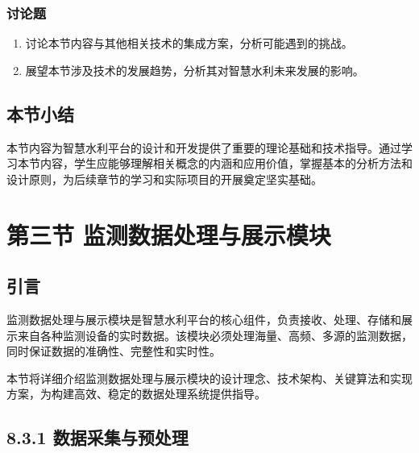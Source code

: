 \hypertarget{ux8ba8ux8bbaux9898}{%
\subsubsection{讨论题}\label{ux8ba8ux8bbaux9898}}

\begin{enumerate}
\def\labelenumi{\arabic{enumi}.}
\tightlist
\item
  讨论本节内容与其他相关技术的集成方案，分析可能遇到的挑战。
\item
  展望本节涉及技术的发展趋势，分析其对智慧水利未来发展的影响。
\end{enumerate}

\hypertarget{ux672cux8282ux5c0fux7ed3}{%
\subsection{本节小结}\label{ux672cux8282ux5c0fux7ed3}}

本节内容为智慧水利平台的设计和开发提供了重要的理论基础和技术指导。通过学习本节内容，学生应能够理解相关概念的内涵和应用价值，掌握基本的分析方法和设计原则，为后续章节的学习和实际项目的开展奠定坚实基础。

\hypertarget{ux7b2cux4e09ux8282-ux76d1ux6d4bux6570ux636eux5904ux7406ux4e0eux5c55ux793aux6a21ux5757}{%
\section{第三节 监测数据处理与展示模块}\label{ux7b2cux4e09ux8282-ux76d1ux6d4bux6570ux636eux5904ux7406ux4e0eux5c55ux793aux6a21ux5757}}

\hypertarget{ux5f15ux8a00-2}{%
\subsection{引言}\label{ux5f15ux8a00-2}}

监测数据处理与展示模块是智慧水利平台的核心组件，负责接收、处理、存储和展示来自各种监测设备的实时数据。该模块必须处理海量、高频、多源的监测数据，同时保证数据的准确性、完整性和实时性。

本节将详细介绍监测数据处理与展示模块的设计理念、技术架构、关键算法和实现方案，为构建高效、稳定的数据处理系统提供指导。

\hypertarget{ux6570ux636eux91c7ux96c6ux4e0eux9884ux5904ux7406}{%
\subsection{8.3.1 数据采集与预处理}\label{ux6570ux636eux91c7ux96c6ux4e0eux9884ux5904ux7406}}


